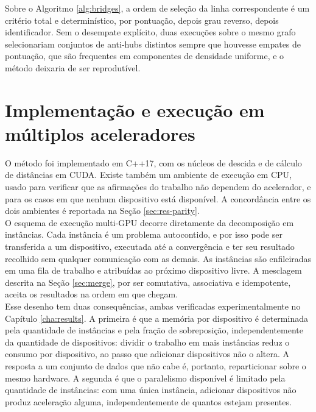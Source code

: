 Sobre o Algoritmo \ref{alg:bridges}, a ordem de seleção da linha correspondente é um critério total e determinístico, por pontuação, depois grau reverso, depois identificador. Sem o desempate explícito, duas execuções sobre o mesmo grafo selecionariam conjuntos de anti-hubs distintos sempre que houvesse empates de pontuação, que são frequentes em componentes de densidade uniforme, e o método deixaria de ser reprodutível.\\

\section{Implementação e execução em múltiplos aceleradores\label{sec:implementation}}

O método foi implementado em C++17, com os núcleos de descida e de cálculo de distâncias em \ac{CUDA}. Existe também um ambiente de execução em \ac{CPU}, usado para verificar que as afirmações do trabalho não dependem do acelerador, e para os casos em que nenhum dispositivo está disponível. A concordância entre os dois ambientes é reportada na Seção \ref{sec:res-parity}.\\

O esquema de execução multi-\ac{GPU} decorre diretamente da decomposição em instâncias. Cada instância é um problema autocontido, e por isso pode ser transferida a um dispositivo, executada até a convergência e ter seu resultado recolhido sem qualquer comunicação com as demais. As instâncias são enfileiradas em uma fila de trabalho e atribuídas ao próximo dispositivo livre. A mesclagem descrita na Seção \ref{sec:merge}, por ser comutativa, associativa e idempotente, aceita os resultados na ordem em que chegam.\\

Esse desenho tem duas consequências, ambas verificadas experimentalmente no Capítulo \ref{cha:results}. A primeira é que a memória por dispositivo é determinada pela quantidade de instâncias e pela fração de sobreposição, independentemente da quantidade de dispositivos: dividir o trabalho em mais instâncias reduz o consumo por dispositivo, ao passo que adicionar dispositivos não o altera. A resposta a um conjunto de dados que não cabe é, portanto, reparticionar sobre o mesmo hardware. A segunda é que o paralelismo disponível é limitado pela quantidade de instâncias: com uma única instância, adicionar dispositivos não produz aceleração alguma, independentemente de quantos estejam presentes.\\

